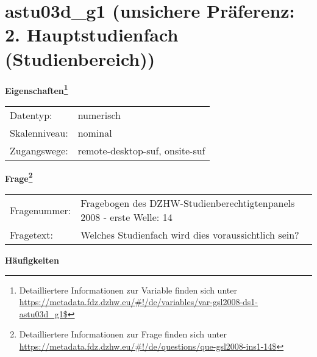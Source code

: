 
    \setcounter{footnote}{0}

    \vspace*{-1.8cm}
	\section{astu03d\_g1 (unsichere Präferenz: 2. Hauptstudienfach (Studienbereich))}
	\label{section:astu03d_g1}



    \vspace*{0.5cm}
    \noindent\textbf{Eigenschaften\footnote{Detailliertere Informationen zur Variable finden sich unter
		\url{https://metadata.fdz.dzhw.eu/\#!/de/variables/var-gsl2008-ds1-astu03d_g1$}}}\\
	\begin{tabularx}{\hsize}{@{}lX}
	Datentyp: & numerisch \\
	Skalenniveau: & nominal \\
	Zugangswege: &
	  remote-desktop-suf, 
	  onsite-suf
 \\
    \end{tabularx}



				\vspace*{0.5cm}
                \noindent\textbf{Frage\footnote{Detailliertere Informationen zur Frage finden sich unter
		              \url{https://metadata.fdz.dzhw.eu/\#!/de/questions/que-gsl2008-ins1-14$}}}\\
				\begin{tabularx}{\hsize}{@{}lX}
					Fragenummer: &
					  Fragebogen des DZHW-Studienberechtigtenpanels 2008 - erste Welle:
					  14
 \\
					Fragetext: & Welches Studienfach wird dies voraussichtlich sein? \\
				\end{tabularx}





        		\vspace*{0.5cm}
                \noindent\textbf{Häufigkeiten}


